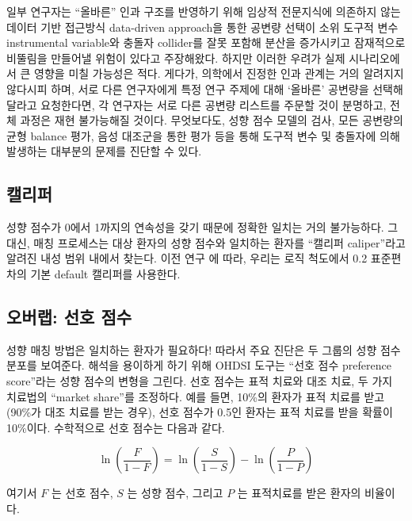 \documentclass[10.5pt]{book}
\theoremstyle{definition}
\theoremstyle{definition}
\theoremstyle{definition}
\theoremstyle{remark}
\begin{document}
일부 연구자는 ``올바른'' 인과 구조를 반영하기 위해 임상적 전문지식에
의존하지 않는 데이터 기반 접근방식 data-driven approach을 통한 공변량
선택이 소위 도구적 변수 instrumental variable와 충돌자 collider를 잘못
포함해 분산을 증가시키고 잠재적으로 비뚤림을 만들어낼 위험이 있다고
주장해왔다. \citep{hernan_2002} 하지만 이러한 우려가 실제 시나리오에서
큰 영향을 미칠 가능성은 적다. \citep{schneeweiss_2018} 게다가, 의학에서
진정한 인과 관계는 거의 알려지지 않다시피 하며, 서로 다른 연구자에게
특정 연구 주제에 대해 `올바른' 공변량을 선택해 달라고 요청한다면, 각
연구자는 서로 다른 공변량 리스트를 주문할 것이 분명하고, 전체 과정은
재현 불가능해질 것이다. 무엇보다도, 성향 점수 모델의 검사, 모든 공변량의
균형 balance 평가, 음성 대조군을 통한 평가 등을 통해 도구적 변수 및
충돌자에 의해 발생하는 대부분의 문제를 진단할 수 있다.
 

\subsection{캘리퍼}


성향 점수가 0에서 1까지의 연속성을 갖기 때문에 정확한 일치는 거의
불가능하다. 그 대신, 매칭 프로세스는 대상 환자의 성향 점수와 일치하는
환자를 ``캘리퍼 caliper''라고 알려진 내성 범위 내에서 찾는다. 이전 연구
\citep{austin_2011} 에 따라, 우리는 로직 척도에서 0.2 표준편차의 기본
default 캘리퍼를 사용한다.

\subsection{오버랩: 선호 점수}\label{--}


성향 매칭 방법은 일치하는 환자가 필요하다! 따라서 주요 진단은 두 그룹의
성향 점수 분포를 보여준다. 해석을 용이하게 하기 위해 OHDSI 도구는 ``선호
점수 preference score''라는 성향 점수의 변형을 그린다.
\citep{walker_2013} 선호 점수는 표적 치료와 대조 치료, 두 가지 치료법의
``market share''를 조정하다. 예를 들면, 10\%의 환자가 표적 치료를 받고
(90\%가 대조 치료를 받는 경우), 선호 점수가 0.5인 환자는 표적 치료를
받을 확률이 10\%이다. 수학적으로 선호 점수는 다음과 같다.

\[\ln\left(\frac{F}{1-F}\right)=\ln\left(\frac{S}{1-S}\right)-\ln\left(\frac{P}{1-P}\right)\]

여기서 \(F\) 는 선호 점수, \(S\) 는 성향 점수, 그리고 \(P\) 는
표적치료를 받은 환자의 비율이다.
\end{document}
